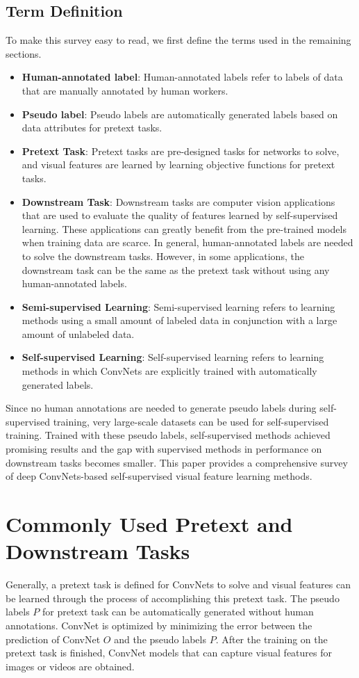 \documentclass[conference]{IEEEtran}
\begin{document}
\subsection{Term Definition}
To make this survey easy to read, we first define the terms used in the remaining sections.
\begin{itemize}
    \item \textbf{Human-annotated label}: Human-annotated labels refer to labels of data that are manually annotated by human workers.
    \item \textbf{Pseudo label}: Pseudo labels are automatically generated labels based on data attributes for pretext tasks.
    \item \textbf{Pretext Task}: Pretext tasks are pre-designed tasks for networks to solve, and visual features are learned by learning objective functions for pretext tasks.
    \item \textbf{Downstream Task}: Downstream tasks are computer vision applications that are used to evaluate the quality of features learned by self-supervised learning. These applications can greatly benefit from the pre-trained models when training data are scarce. In general, human-annotated labels are needed to solve the downstream tasks. However, in some applications, the downstream task can be the same as the pretext task without using any human-annotated labels.
    \item \textbf{Semi-supervised Learning}: Semi-supervised learning refers to learning methods using a small amount of labeled data in conjunction with a large amount of unlabeled data.
    \item \textbf{Self-supervised Learning}: Self-supervised learning refers to learning methods in which ConvNets are explicitly trained with automatically generated labels. 
\end{itemize}

Since no human annotations are needed to generate pseudo labels during self-supervised training, very large-scale datasets can be used for self-supervised training.
Trained with these pseudo labels, self-supervised methods achieved promising results and the gap with supervised methods in performance on downstream tasks becomes smaller.
This paper provides a comprehensive survey of deep ConvNets-based self-supervised visual feature learning methods.

\section{Commonly Used Pretext and Downstream Tasks}
Generally, a pretext task is defined for ConvNets to solve and visual features can be learned through the process of accomplishing this pretext task.
The pseudo labels $P$ for pretext task can be automatically generated without human annotations.
ConvNet is optimized by minimizing the error between the prediction of ConvNet $O$ and the pseudo labels $P$. After the training on the pretext task is finished, ConvNet models that can capture visual features for images or videos are obtained.
\end{document}
